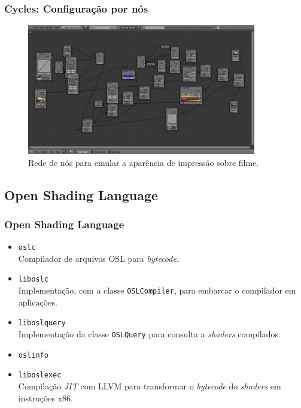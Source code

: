 \documentclass{beamer}
\begin{document}
\begin{frame}

\frametitle{Cycles: Configuração por nós}

\begin{figure}[!htb]
\center
\includegraphics[width=10cm]{film_lookNodeNetwork}
\caption{Rede de nós para emular a aparência de impressão sobre filme.}
\label{nodes}
\end{figure}

\end{frame}

\subsection{Open Shading Language}
\begin{frame}
\frametitle{Open Shading Language}
\begin{itemize}
\item \texttt{oslc} \\ Compilador de arquivos OSL para \emph{bytecode}.

\item \texttt{liboslc} \\ Implementação, com a classe \texttt{OSLCompiler}, para embarcar o compilador em aplicações.

\item \texttt{liboslquery} \\ Implementação da classe \texttt{OSLQuery} para consulta a {\it shaders} compilados.

\item \texttt{oslinfo}

\item \texttt{liboslexec} \\ Compilação {\it JIT} com LLVM para transformar o \emph{bytecode} do {\it shaders} em instruções x86.

\end{itemize}
\end{frame}
\end{document}
